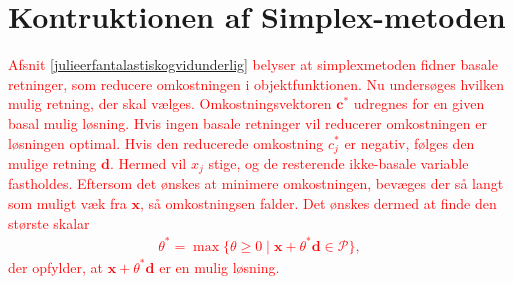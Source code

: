 \section{Kontruktionen af Simplex-metoden}
%
\textcolor{red}{
Afsnit \ref{julieerfantalastiskogvidunderlig} belyser at simplexmetoden fidner basale retninger, som reducere omkostningen i objektfunktionen. Nu undersøges hvilken mulig retning, der skal vælges. 
Omkostningsvektoren $\mathbf{c}^*$ udregnes for en given basal mulig løsning. 
Hvis ingen basale retninger vil reducerer omkostningen  er løsningen optimal. 
Hvis den reducerede omkostning $c^*_j$ er negativ, følges den mulige retning $\mathbf{d}$. 
Hermed vil $x_j$ stige, og de resterende ikke-basale variable fastholdes.
Eftersom det ønskes at minimere omkostningen, bevæges der så langt som muligt væk fra $\mathbf{x}$, så omkostningsen falder.
Det ønskes dermed at finde den største skalar
\begin{align*}
\theta^* = \max \{ \theta \geq 0 \mid \textbf{x} + \theta^*\textbf{d} \in \mathcal{P} \},
\end{align*}
%
der opfylder, at $\mathbf{x} + \theta^* \mathbf{d}$ er en mulig løsning.
}
%
%
%	
%	
%	
%	
%